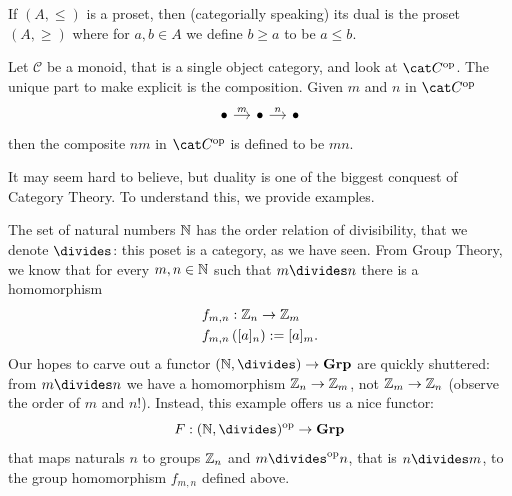 \begin{example}
  If \((A, \le)\) is a proset, then (categorially speaking) its dual is
  the proset \((A, \ge)\) where for \(a, b \in A\) we define \(b \ge a\)
  to be \(a \le b\).
\end{example}


\begin{example}
  Let \(\mathcal{C}\) be a monoid, that is a single object category, and look
  at \(\opcat C\). The unique part to make explicit is the
  composition. Given \(m\) and \(n\) in \(\opcat C\)
  \[
    \begin{tikzcd}[column sep=small]
      \bullet \ar["{m}", r] & \bullet \ar["{n}", r] & \bullet
    \end{tikzcd}
  \]
  then the composite \(n m\) in \(\opcat C\) is defined to be \(m n\).
\end{example}

It may seem hard to believe, but duality is one of the biggest conquest
of Category Theory. To understand this, we provide examples.

\begin{example}
  The set of natural numbers \(\mathbb N\) has the order relation of
  divisibility, that we denote \(\divides\): this poset is a category,
  as we have seen. From Group Theory, we know that for every
  \(m, n \in \mathbb N\) such that \(m \divides n\) there is a
  homomorphism
  \begin{align*}
    & f_{m, n} : \mathbb Z_n \to \mathbb Z_m \\
    & f_{m, n} \left([a]_n\right) := [a]_m .
  \end{align*}
  Our hopes to carve out a functor \((\naturals, \divides) \to \Grp\) are
  quickly shuttered: from \(m \divides n\) we have a homomorphism
  \(\mathbb Z_n \to \mathbb Z_m\), not \(\mathbb Z_m \to \mathbb Z_n\)
  (observe the order of \(m\) and \(n\)!). Instead, this example offers
  us a nice functor:
  \[
    F : \op{(\naturals, \divides)} \to \Grp
  \]
  that maps naturals \(n\) to groups \(\mathbb Z_n\) and
  \(m \op\divides n\), that is \(n \divides m\), to the group
  homomorphism \(f_{m,n}\) defined above.
\end{example}

